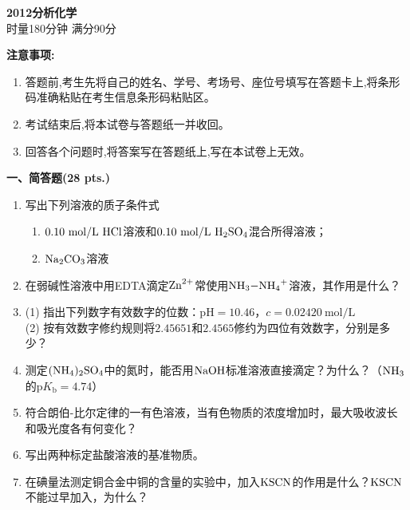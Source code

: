 \begin{center}
    {\LARGE \textbf{2012分析化学}} \\[2ex]
    {\large 时量180分钟 \quad 满分90分}
\end{center}

\vspace{0.5cm}
\noindent\textbf{注意事项:}
\begin{enumerate}[label=\arabic*., parsep=0pt, itemsep=0pt]
    \item 答题前,考生先将自己的姓名、学号、考场号、座位号填写在答题卡上,将条形码准确粘贴在考生信息条形码粘贴区。
    \item 考试结束后,将本试卷与答题纸一并收回。
    \item 回答各个问题时,将答案写在答题纸上,写在本试卷上无效。
\end{enumerate}

\vspace{0.5cm}
\noindent\textbf{一、简答题(28 pts.)}

\begin{enumerate}[label=\arabic*., itemsep=1.5ex]
    \item 写出下列溶液的质子条件式
    \begin{enumerate}[label=(\arabic*), noitemsep, topsep=0pt, partopsep=0pt]
        \item $0.10\ \mathrm{mol/L}\ \ce{HCl}$溶液和$0.10\ \mathrm{mol/L}\ \ce{H2SO4}$混合所得溶液；
        \item $\ce{Na2CO3}$溶液
    \end{enumerate}
    \item 在弱碱性溶液中用EDTA滴定$\ce{Zn^{2+}}$常使用$\ce{NH3-NH4+}$溶液，其作用是什么？
    \item (1) 指出下列数字有效数字的位数：$\mathrm{pH}=10.46$，$c=0.02420\ \mathrm{mol/L}$
    \\
    (2) 按有效数字修约规则将$2.45651$和$2.4565$修约为四位有效数字，分别是多少？
    \item 测定$\ce{(NH4)2SO4}$中的氮时，能否用$\ce{NaOH}$标准溶液直接滴定？为什么？（$\ce{NH3}$的$\mathrm{p}K_\mathrm{b}=4.74$）
    \item 符合朗伯-比尔定律的一有色溶液，当有色物质的浓度增加时，最大吸收波长和吸光度各有何变化？
    \item 写出两种标定盐酸溶液的基准物质。
    \item 在碘量法测定铜合金中铜的含量的实验中，加入$\ce{KSCN}$的作用是什么？$\ce{KSCN}$不能过早加入，为什么？
\end{enumerate}

